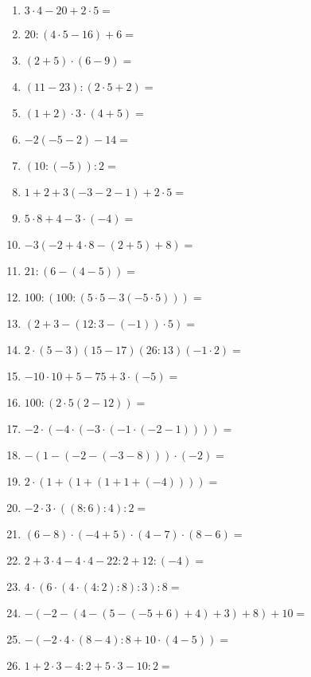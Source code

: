 \begin{Exercise}[title={Berechne die folgenden Ausdrücke}, label=einfachesRechnenA1]

	\begin{minipage}{\textwidth}
		\begin{minipage}{0.5\textwidth}
			\begin{enumerate}[label=\alph*)]
				\item \(3\cdot 4-20+2\cdot 5=\)
				\item \(20:\left( 4\cdot 5-16\right) +6=\)
				\item \(\left( 2+5\right) \cdot \left( 6-9\right) =\)
				\item \(\left( 11-23\right) :\left( 2\cdot 5+2\right) =\)
				\item \(\left( 1+2\right) \cdot3\cdot\left( 4+5\right) =\)
				\item \(-2\left( -5-2\right) -14=\)
				\item \(\left( 10:\left( -5\right)\right)  :2=\)
				\item \(1+2+3\left( -3-2-1\right) +2\cdot 5=\)
				\item \(5\cdot 8+4-3\cdot \left( -4\right) =\)
				\item \(-3\left( -2+4\cdot 8-\left( 2+5\right) +8\right) =\)
				\item \(21:\left( 6-\left( 4-5\right) \right) =\)
				\item \(100:\left( 100:\left( 5\cdot 5-3\left( -5\cdot 5\right) \right) \right) =\)
				\item \(\left( 2+3-\left( 12:3-\left( -1\right) \right)\cdot 5 \right) =\)
			\end{enumerate}%
		\end{minipage}%
		\begin{minipage}{0.5\textwidth}
			\begin{enumerate}[label=\alph*)]
				\setcounter{enumi}{13}
				\item \(2\cdot\left(5-3\right) \left( 15-17\right) \left( 26:13\right) \left( -1\cdot 2\right) = \)
				\item \(-10\cdot 10+5-75+3\cdot\left( -5\right) =\)
				\item \(100:(2\cdot 5(2-12))=\)
				\item \(-2\cdot(-4\cdot (-3\cdot (-1\cdot (-2-1))))=\)
				\item \(-(1-(-2-(-3-8)))\cdot (-2)=\)
				\item \(2\cdot(1+(1+(1+1+(-4))))=\)
				\item \(-2\cdot 3\cdot ((8:6):4):2=\)
				\item \((6-8)\cdot(-4+5)\cdot(4-7)\cdot(8-6)=\)
				\item \(2+3\cdot 4-4\cdot 4-22:2+12:(-4)=\)
				\item \(4\cdot(6\cdot(4\cdot(4:2):8):3):8=\)
				\item \(-(-2-(4-(5-(-5+6)+4)+3)+8)+10=\)
				\item \(-(-2\cdot 4\cdot (8-4):8+10\cdot (4-5))=\)
				\item \(1+2\cdot 3-4:2+5\cdot 3-10:2=\)
			\end{enumerate}%
		\end{minipage}%
	\end{minipage}%
\end{Exercise}
